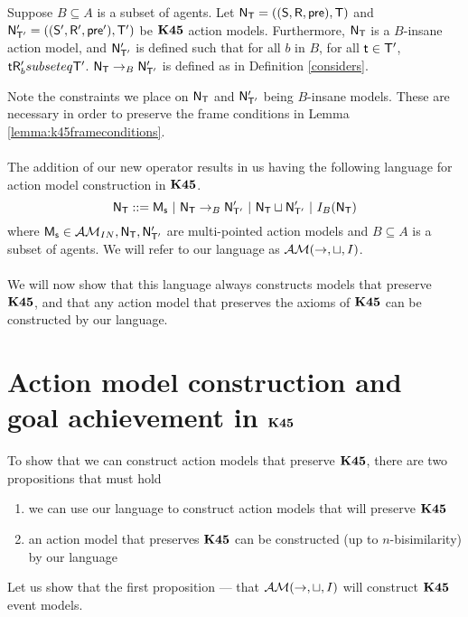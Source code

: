 \begin{defn} \label{defn:k45:considers}
	Suppose $B \subseteq A$ is a subset of agents.
	Let $\mathrm{\mathsf{N}}_\mathrm{\mathsf{T}} = ((\mathrm{\mathsf{S}},\mathrm{\mathsf{R}},\mathrm{\mathsf{pre}}),\mathrm{\mathsf{T}})$ and $\mathrm{\mathsf{N}}'_{\mathrm{\mathsf{T}}'} = ((\mathrm{\mathsf{S}}',\mathrm{\mathsf{R}}',\mathrm{\mathsf{pre}}'),\mathrm{\mathsf{T}}')$ be $\bf K45$ action models.
	Furthermore, $\mathrm{\mathsf{N}}_\mathrm{\mathsf{T}}$ is a $B$-insane action model, and $\mathrm{\mathsf{N}}'_{\mathrm{\mathsf{T}}'}$ is defined such that for
	all $b$ in $B$, for all $\mathrm{\mathsf{t}} \in \mathrm{\mathsf{T}}'$, $\mathrm{\mathsf{t}} \mathrm{\mathsf{R}}'_b subseteq \mathrm{\mathsf{T}}'$.
	$\mathrm{\mathsf{N}}_\mathrm{\mathsf{T}} \to_B \mathrm{\mathsf{N}}'_{\mathrm{\mathsf{T}}'}$ is defined as in Definition \ref{considers}.
\end{defn}

Note the constraints we place on $\mathrm{\mathsf{N}}_\mathrm{\mathsf{T}}$ and $\mathrm{\mathsf{N}}'_{\mathrm{\mathsf{T}}'}$ being $B$-insane models.
These are necessary in order to preserve the frame conditions in Lemma
\ref{lemma:k45frameconditions}.\\
\\
\newcommand{\EM}{\ensuremath{\eventClass}}
The addition of our new operator results in us having the following language for
action model construction in $\bf K45$.
\[
	\mathrm{\mathsf{N}}_\mathrm{\mathsf{T}} ::= \mathrm{\mathsf{M_s}} \text{ } | \text{ }\mathrm{\mathsf{N}}_\mathrm{\mathsf{T}} \to_B \mathrm{\mathsf{N}}'_{\mathrm{\mathsf{T}}'} \text{ }|
  \text{ } \mathrm{\mathsf{N}}_\mathrm{\mathsf{T}} \sqcup \mathrm{\mathsf{N}}'_{\mathrm{\mathsf{T}}'} \text{ } | \text{ } I_B(\mathrm{\mathsf{N}}_\mathrm{\mathsf{T}})
\]
where $\mathrm{\mathsf{M_s}} \in \mathcal{AM}_{IN}, \mathrm{\mathsf{N}}_\mathrm{\mathsf{T}}, \mathrm{\mathsf{N}}'_{\mathrm{\mathsf{T}}'}$ are multi-pointed action models and $B \subseteq
A$ is a subset of agents.
We will refer to our language as $\EM(\to,\sqcup,I)$. \\
\\
We will now show that this language always constructs models that preserve $\bf K45$, and that any
action model that preserves the axioms of $\bf K45$ can be constructed by our language.

\section{Action model construction and goal achievement in $\bf K45$} \label{subsec:k45:goalAchievement}

To show that we can construct action models that preserve $\bf K45$, there are two propositions that
must hold
\begin{enumerate}
	\item we can use our language to construct action models that will preserve $\bf K45$
	\item an action model that preserves $\bf K45$ can be constructed (up to $n$-bisimilarity) by our
		language
\end{enumerate}

Let us show that the first proposition --- that $\EM(\to,\sqcup,I)$ will construct $\bf K45$ event
models.

